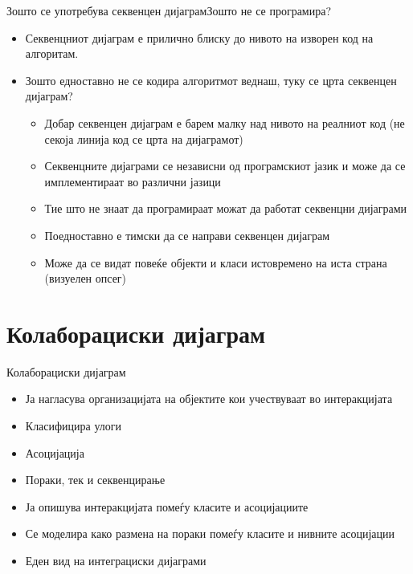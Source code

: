 \begin{frame}{Зошто се употребува секвенцен дијаграм}{Зошто не се програмира?}
\begin{itemize}
  \item Секвенцниот дијаграм е прилично блиску до нивото на изворен код на
  алгоритам.
  \item Зошто едноставно не се кодира алгоритмот веднаш, туку се црта секвенцен
  дијаграм?
  \begin{itemize}
  \item Добар секвенцен дијаграм е барем малку над нивото на реалниот код (не секоја линија код се црта на дијаграмот)
  \item Секвенцните дијаграми се независни од програмскиот јазик и може да се
  имплементираат во различни јазици
  \item Тие што не знаат да програмираат можат да работат секвенцни дијаграми
  \item Поедноставно е тимски да се направи секвенцен дијаграм
  \item Може да се видат повеќе објекти и класи истовремено на иста страна (визуелен опсег)
\end{itemize}
\end{itemize}
\end{frame}

\section{Колаборациски дијаграм}

\begin{frame}{Колаборациски дијаграм}
\begin{itemize}
  \item Ја нагласува организацијата на објектите кои учествуваат во интеракцијата
  \item Класифицира улоги
  \item Асоцијација
  \item Пораки, тек и секвенцирање
  \item Ја опишува интеракцијата помеѓу класите и асоцијациите
  \item Се моделира како размена на пораки помеѓу класите и нивните асоцијации
  \item Еден вид на интеграциски дијаграми
\end{itemize}
\end{frame}

